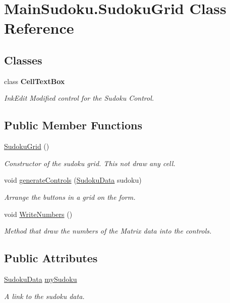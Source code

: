 \hypertarget{class_main_sudoku_1_1_sudoku_grid}{\section{Main\-Sudoku.\-Sudoku\-Grid Class Reference}
\label{class_main_sudoku_1_1_sudoku_grid}
}
\subsection*{Classes}
\begin{DoxyCompactItemize}
\item 
class {\bfseries Cell\-Text\-Box}
\begin{DoxyCompactList}\small\item\em Ink\-Edit Modified control for the Sudoku Control. \end{DoxyCompactList}\end{DoxyCompactItemize}
\subsection*{Public Member Functions}
\begin{DoxyCompactItemize}
\item 
\hyperlink{class_main_sudoku_1_1_sudoku_grid_acb511a465a1444ec09a0173525a878c2}{Sudoku\-Grid} ()
\begin{DoxyCompactList}\small\item\em Constructor of the sudoku grid. This not draw any cell. \end{DoxyCompactList}\item 
void \hyperlink{class_main_sudoku_1_1_sudoku_grid_a725908345a4ed7788b8ea3b21cceb642}{generate\-Controls} (\hyperlink{class_main_sudoku_1_1_sudoku_data}{Sudoku\-Data} sudoku)
\begin{DoxyCompactList}\small\item\em Arrange the buttons in a grid on the form. \end{DoxyCompactList}\item 
void \hyperlink{class_main_sudoku_1_1_sudoku_grid_aef7029a377a4141af7185dbc4399439d}{Write\-Numbers} ()
\begin{DoxyCompactList}\small\item\em Method that draw the numbers of the Matrix data into the controls. \end{DoxyCompactList}\end{DoxyCompactItemize}
\subsection*{Public Attributes}
\begin{DoxyCompactItemize}
\item 
\hyperlink{class_main_sudoku_1_1_sudoku_data}{Sudoku\-Data} \hyperlink{class_main_sudoku_1_1_sudoku_grid_a2f0a0b1da2830add953ddf9ae8f559f8}{my\-Sudoku}
\begin{DoxyCompactList}\small\item\em A link to the sudoku data. \end{DoxyCompactList}\end{DoxyCompactItemize}
